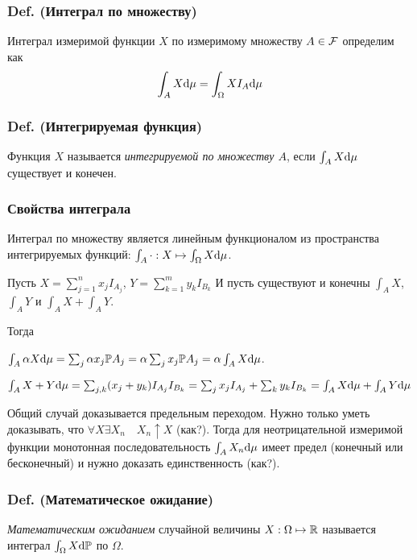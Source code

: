 \subsubsection{Def. (Интеграл по
множеству)}\label{def.-ux438ux43dux442ux435ux433ux440ux430ux43b-ux43fux43e-ux43cux43dux43eux436ux435ux441ux442ux432ux443}

Интеграл измеримой функции \(X\) по измеримому множеству
\(A \in \mathcal F\) определим как
\[ \int_A X\mathrm d\mu = \int_\Omega X I_A \mathrm d\mu \]

\subsubsection{Def. (Интегрируемая
функция)}\label{def.-ux438ux43dux442ux435ux433ux440ux438ux440ux443ux435ux43cux430ux44f-ux444ux443ux43dux43aux446ux438ux44f}

Функция \(X\) называется \emph{интегрируемой по множеству \(A\)}, если
\(\int_A X\mathrm d\mu\) существует и конечен.

\subsubsection{Свойства
интеграла}\label{ux441ux432ux43eux439ux441ux442ux432ux430-ux438ux43dux442ux435ux433ux440ux430ux43bux430}

Интеграл по множеству является линейным функционалом из пространства
интегрируемых функций:
\({\int_A \cdot : X \mapsto \int_\Omega X \mathrm d\mu}\).

Пусть \(X = \sum_{j=1}^n x_j I_{A_j}\), \(Y = \sum_{k=1}^m y_k I_{B_k}\)
И пусть существуют и конечны \(\int_A X\), \(\int_A Y\) и
\(\int_A X + \int_A Y\).

Тогда

\(\int_A \alpha X \mathrm d\mu = \sum_j \alpha x_j \mathbb P A_j = \alpha \sum_j x_j \mathbb P A_j = \alpha \int_A X\mathrm d\mu\).

\(\int_A X+Y \mathrm d\mu = \sum_{j,k} (x_j + y_k) I_{A_j} I_{B_k} = \sum_j x_j I_{A_j} + \sum_k y_k I_{B_k} = \int_A X\mathrm d\mu + \int_A Y\mathrm d\mu\)

Общий случай доказывается предельным переходом. Нужно только уметь
доказывать, что \(\forall X \exists X_n \quad {X_n \uparrow X}\) (как?).
Тогда для неотрицательной измеримой функции монотонная
последовательность \(\int_A X_n\mathrm d\mu\) имеет предел (конечный или
бесконечный) и нужно доказать единственность (как?).

\subsubsection{Def. (Математическое
ожидание)}\label{def.-ux43cux430ux442ux435ux43cux430ux442ux438ux447ux435ux441ux43aux43eux435-ux43eux436ux438ux434ux430ux43dux438ux435}

\emph{Математическим ожиданием} случайной величины
\(X : \Omega\mapsto\mathbb R\) называется интеграл \(\int_\Omega X \mathrm d\mathbb P\) по
\(\Omega\).
